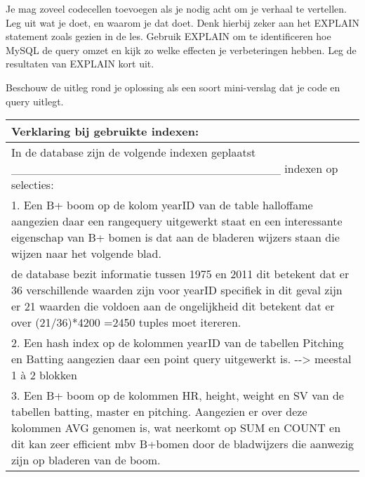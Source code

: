\documentclass[11pt]{article}
\begin{document}
Je mag zoveel codecellen toevoegen als je nodig acht om je verhaal te
vertellen. Leg uit wat je doet, en waarom je dat doet. Denk hierbij
zeker aan het EXPLAIN statement zoals gezien in de les. Gebruik EXPLAIN
om te identificeren hoe MySQL de query omzet en kijk zo welke effecten
je verbeteringen hebben. Leg de resultaten van EXPLAIN kort uit.

Beschouw de uitleg rond je oplossing als een soort mini-verslag dat je
code en query uitlegt.

    \begin{longtable}[]{@{}l@{}}
\toprule
\begin{minipage}[b]{0.35\columnwidth}\raggedright\strut
Verklaring bij gebruikte indexen:\strut
\end{minipage}\tabularnewline
\midrule
\endhead
\begin{minipage}[t]{0.35\columnwidth}\raggedright\strut
In de database zijn de volgende indexen geplaatst
\_\_\_\_\_\_\_\_\_\_\_\_\_\_\_\_\_\_\_\_\_\_\_\_\_\_\_\_\_\_\_\_ indexen
op selecties:\strut
\end{minipage}\tabularnewline
\begin{minipage}[t]{0.35\columnwidth}\raggedright\strut
1. Een B+ boom op de kolom yearID van de table halloffame aangezien daar
een rangequery uitgewerkt staat en een interessante eigenschap van B+
bomen is dat aan de bladeren wijzers staan die wijzen naar het volgende
blad.\strut
\end{minipage}\tabularnewline
\begin{minipage}[t]{0.35\columnwidth}\raggedright\strut
de database bezit informatie tussen 1975 en 2011 dit betekent dat er 36
verschillende waarden zijn voor yearID specifiek in dit geval zijn er 21
waarden die voldoen aan de ongelijkheid dit betekent dat er over
(21/36)*4200 =2450 tuples moet itereren.\strut
\end{minipage}\tabularnewline
\begin{minipage}[t]{0.35\columnwidth}\raggedright\strut
2. Een hash index op de kolommen yearID van de tabellen Pitching en
Batting aangezien daar een point query uitgewerkt is. -\/-\textgreater{}
meestal 1 à 2 blokken\strut
\end{minipage}\tabularnewline
\begin{minipage}[t]{0.35\columnwidth}\raggedright\strut
3. Een B+ boom op de kolommen HR, height, weight en SV van de tabellen
batting, master en pitching. Aangezien er over deze kolommen AVG genomen
is, wat neerkomt op SUM en COUNT en dit kan zeer efficient mbv B+bomen
door de bladwijzers die aanwezig zijn op bladeren van de boom.\strut

\end{minipage}
\end{longtable}
\end{document}
